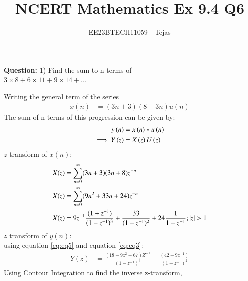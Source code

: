 \documentclass[journal,12pt,twocolumn]{IEEEtran}
\theoremstyle{remark}
\begin{document}

\vspace{3cm}

\title{NCERT Mathematics Ex 9.4 Q6}
\author{EE23BTECH11059 - Tejas$^{}$%
}
\maketitle
\newpage
\textbf{Question:}
1) Find the sum to n terms of\\$3 \times 8 + 6 \times 11 + 9 \times 14 + ...$
        

    
    \solution
        
        Writing the general term of the series
        \begin{align}
            x(n)&=(3n+3)(8+3n)u(n)
        \end{align}
        The sum of n terms of this progression can be given by:
        \begin{align}
    y\left(n\right) &= x\left(n\right)*u\left(n\right)\\
    \implies  Y\left(z\right) &= X\left(z\right)U\left(z\right) \label{eq:eq3}
\end{align}
$z$ transform of $x(n)$:
        \begin{align}
            X(z) &= \sum_{n=0}^{\infty} (3n+3)(3n+8)z^{-n} \\
            X(z) &= \sum_{n=0}^{\infty} (9n^2 +33n+24)z^{-n} \\
            X(z)&=9z^{-1}\frac{(1+z^{-1})}{(1-z^{-1})^3} + \frac{33}{(1-z^{-1})^2} +24\frac{1}{1-z^{-1}}; \left\vert z\right\vert>1    \label{eq:eq5}
        \end{align}
        $z$ transform of $y(n)$:\\
        using equation \eqref{eq:eq5} and equation \eqref{eq:eq3}:
        \begin{align}
        Y(z)&= \frac{(18-9z^2+67)Z^{-1}}{(1-z^{-1})^3} + \frac{(42-9z^{-1})}{(1-z^{-1})^2} 
        \end{align}
        Using Contour Integration  to find the inverse z-transform,
        
\end{document}
